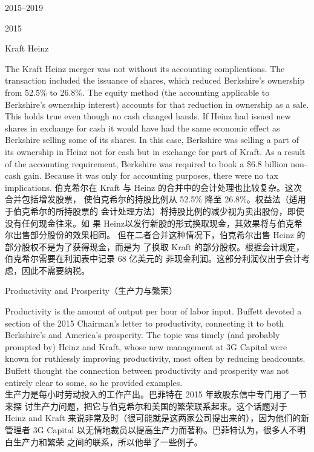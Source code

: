 \begin{chapter}{2015--2019}
\begin{section}{2015}
\begin{subsection}{Kraft Heinz}
\begin{verseparallel}
{    The Kraft Heinz merger was not without its accounting complications. The
    transaction included the issuance of shares, which reduced Berkshire’s
    ownership from 52.5\% to 26.8\%. The equity method (the accounting
    applicable to Berkshire’s ownership interest) accounts for that reduction
    in ownership as a sale. This holds true even though no cash changed hands.
    If Heinz had issued new shares in exchange for cash it would have had the
    same economic effect as Berkshire selling some of its shares. In this case,
    Berkshire was selling a part of its ownership in Heinz not for cash but in
    exchange for part of Kraft. As a result of the accounting requirement,
    Berkshire was required to book a \$6.8 billion non-cash gain. Because it was
    only for accounting purposes, there were no tax implications.
  }
  {
    伯克希尔在 Kraft 与 Heinz 的合并中的会计处理也比较复杂。这次合并包括增发股票，
    使伯克希尔的持股比例从 52.5\% 降至 26.8\%。权益法（适用于伯克希尔的所持股票的
    会计处理方法）将持股比例的减少视为卖出股份，即使没有任何现金往来。如
    果 Heinz以发行新股的形式换取现金，其效果将与伯克希尔出售部分股份的效果相同。
    但在二者合并这种情况下，伯克希尔出售 Heinz 的部分股权不是为了获得现金，而是为
    了换取 Kraft 的部分股权。根据会计规定，伯克希尔需要在利润表中记录 68 亿美元的
    非现金利润。这部分利润仅出于会计考虑，因此不需要纳税。
  } 

\end{verseparallel}

\end{subsection}

\begin{subsection}{Productivity and Prosperity（生产力与繁荣）}
\begin{verseparallel}
  {
    Productivity is the amount of output per hour of labor input. Buffett
    devoted a section of the 2015 Chairman's letter to productivity, connecting
    it to both Berkshire's and America's prosperity. The topic was timely (and
    probably prompted by) Heinz and Kraft, whose new management at 3G Capital
    were known for ruthlessly improving productivity, most often by reducing
    headcounts. Buffett thought the connection between productivity and
    prosperity was not entirely clear to some, so he provided examples. \\
  }
  {
    生产力是每小时劳动投入的工作产出。巴菲特在 2015 年致股东信中专门用了一节来探
    讨生产力问题，把它与伯克希尔和美国的繁荣联系起来。这个话题对于 Heinz and
    Kraft 来说非常及时（很可能就是这两家公司提出来的），因为他们的新管理者 3G
    Capital 以无情地裁员以提高生产力而著称。巴菲特认为，很多人不明白生产力和繁荣
    之间的联系，所以他举了一些例子。
  }
\end{verseparallel}


\end{subsection}
\end{section}
\end{chapter}
